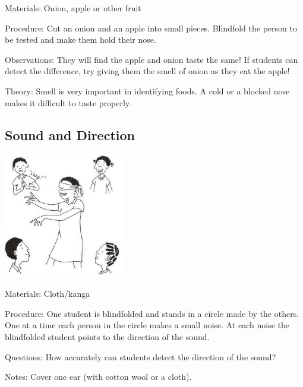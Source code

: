 \begin{multicols}{2}
\begin{description*}
\item[Materials:]{Onion, apple or other fruit}
\item[Procedure:]{Cut an onion and an apple into small pieces. Blindfold the person to be
tested and make them hold their nose.}
\item[Observations:]{They will find the apple and
onion taste the same! If students can detect the difference, try giving
them the smell of onion as they eat the apple!}
\item[Theory:]{Smell is very important
in identifying foods. A cold or a blocked nose makes it difficult to taste
properly.}
\end{description*}

\subsection{Sound and Direction}

\begin{center}
\includegraphics[width=0.4\textwidth]{./img/vso/sound-direction.jpg}
\end{center}

\begin{description*}
\item[Materials:]{Cloth/kanga}
\item[Procedure:]{One student is blindfolded and
stands in a circle made by the
others. One at a time each person
in the circle makes a small noise.
At each noise the blindfolded
student points to the direction of
the sound.}
\item[Questions:]{How accurately can students
detect the direction of the sound?}
\item[Notes:]{Cover one ear (with cotton wool
or a cloth).}
\end{description*}


\end{multicols}
